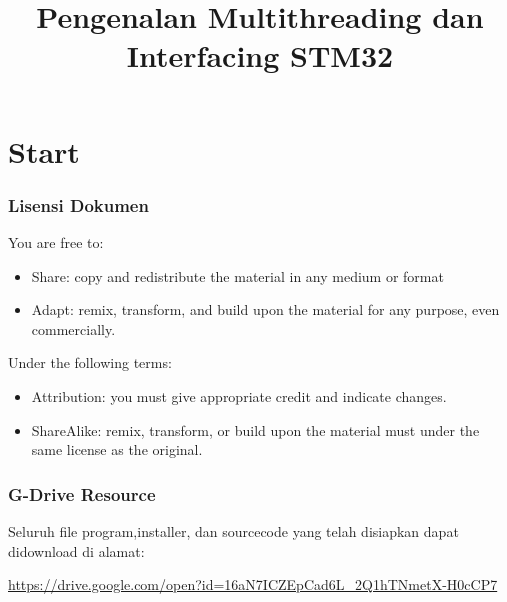 \documentclass[table,dvipsnames]{beamer}
\title[STM32 Beginner Guide]{Pengenalan Multithreading dan Interfacing STM32}
\author{}
\institute[CodeDirect-FTITOS : \ccbysa]{
	Achmadi ST MT\\
	\medskip
	\textit{}
}
\date{}
\begin{document}
	\section{Start}

	\begin{frame}
	\titlepage
	\end{frame}

	\begin{frame}
		\frametitle{Lisensi Dokumen}
		\begin{exampleblock}{}
			\doclicenseThis
		\end{exampleblock}
	
		\begin{exampleblock}{}
			You are free to:
			\begin{itemize}
				\item Share: copy and redistribute the material in any medium or format
				\item Adapt: remix, transform, and build upon the material
				for any purpose, even commercially.
			\end{itemize}
		\end{exampleblock}
	
		\begin{exampleblock}{}
			Under the following terms:
			\begin{itemize}
				\item Attribution: you must give appropriate credit and indicate changes.
				\item ShareAlike: remix, transform, or build upon the material must under the same license as the original.
			\end{itemize}
		\end{exampleblock}
	\end{frame}

	\begin{frame}
		\frametitle{G-Drive Resource}
		\begin{exampleblock}{}
			\begin{exampleblock}{}
			Seluruh file program,installer, dan sourcecode
			yang telah disiapkan dapat didownload di alamat:\\
			\end{exampleblock}
			
			\begin{exampleblock}{}
			\url{https://drive.google.com/open?id=16aN7ICZEpCad6L_2Q1hTNmetX-H0cCP7}
			\end{exampleblock}
		\end{exampleblock}
	\end{frame}
\end{document}
